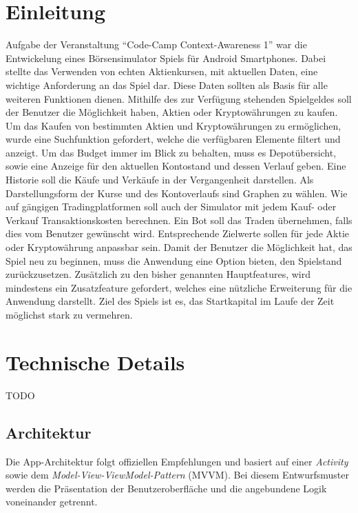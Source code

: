 \documentclass[a4paper]{article}
\begin{document}
\section{Einleitung}
\label{sec:introduction}
Aufgabe der Veranstaltung "`Code-Camp Context-Awareness 1"' war die Entwickelung eines Börsensimulator Spiels für Android Smartphones. Dabei stellte das Verwenden von echten Aktienkursen, mit aktuellen Daten, eine wichtige Anforderung an das Spiel dar. Diese Daten sollten als Basis für alle weiteren Funktionen dienen. Mithilfe des zur Verfügung stehenden Spielgeldes soll der Benutzer die Möglichkeit haben, Aktien oder Kryptowährungen zu kaufen. Um das Kaufen von bestimmten Aktien und Kryptowährungen zu ermöglichen, wurde eine Suchfunktion gefordert, welche die verfügbaren Elemente filtert und anzeigt. Um das Budget immer im Blick zu behalten, muss es Depotübersicht, sowie eine Anzeige für den aktuellen Kontostand und dessen Verlauf geben. Eine Historie soll die Käufe und Verkäufe in der Vergangenheit darstellen. Als Darstellungsform der Kurse und des Kontoverlaufs sind Graphen zu wählen. Wie auf gängigen Tradingplatformen soll auch der Simulator mit jedem Kauf- oder Verkauf Transaktionskosten berechnen. Ein Bot soll das Traden übernehmen, falls dies vom Benutzer gewünscht wird. Entsprechende Zielwerte sollen für jede Aktie oder Kryptowährung anpassbar sein. Damit der Benutzer die Möglichkeit hat, das Spiel neu zu beginnen, muss die Anwendung eine Option bieten, den Spielstand zurückzusetzen. Zusätzlich zu den bisher genannten Hauptfeatures, wird mindestens ein Zusatzfeature gefordert, welches eine nützliche Erweiterung für die Anwendung darstellt. Ziel des Spiels ist es, das Startkapital im Laufe der Zeit möglichst stark zu vermehren.


\section{Technische Details}
\label{sec:technologies}
TODO


\subsection{Architektur}
\label{subsec:technologies:architecture}
Die App-Architektur folgt offiziellen Empfehlungen\autocite{google_recommendations} und basiert auf einer \textit{Activity} sowie dem \textit{Model-View-ViewModel-Pattern} (MVVM).
Bei diesem Entwurfsmuster werden die Präsentation der Benutzeroberfläche und die angebundene Logik voneinander getrennt.
\end{document}
